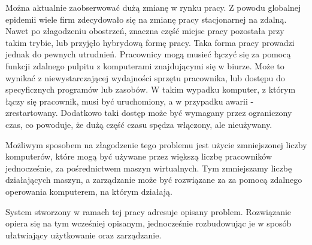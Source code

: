 \documentclass[../wstep.tex]{subfiles}
\begin{document}
Można aktualnie zaobserwować dużą zmianę w rynku pracy. Z powodu globalnej epidemii wiele firm zdecydowało się na zmianę pracy stacjonarnej na zdalną. Nawet po złagodzeniu obostrzeń, znaczna część miejsc pracy pozostała przy takim trybie, lub przyjęło hybrydową formę pracy. Taka forma pracy prowadzi jednak do pewnych utrudnień. Pracownicy mogą musieć łączyć się za pomocą funkcji zdalnego pulpitu z komputerami znajdującymi się w biurze. Może to wynikać z niewystarczającej wydajności sprzętu pracownika, lub dostępu do specyficznych programów lub zasobów. W takim wypadku komputer, z którym łączy się pracownik, musi być uruchomiony, a w przypadku awarii - zrestartowany. Dodatkowo taki dostęp może być wymagany przez ograniczony czas, co powoduje, że dużą część czasu spędza włączony, ale nieużywany.

Możliwym sposobem na złagodzenie tego problemu jest użycie zmniejszonej liczby komputerów, które mogą być używane przez większą liczbę pracowników jednocześnie, za pośrednictwem maszyn wirtualnych. Tym zmniejszamy liczbę działających maszyn, a zarządzanie może być rozwiązane za za pomocą zdalnego operowania komputerem, na którym działają.

System stworzony w ramach tej pracy adresuje opisany problem. Rozwiązanie opiera się na tym wcześniej opisanym, jednocześnie rozbudowując je w sposób ułatwiający użytkowanie oraz zarządzanie.
\end{document}

